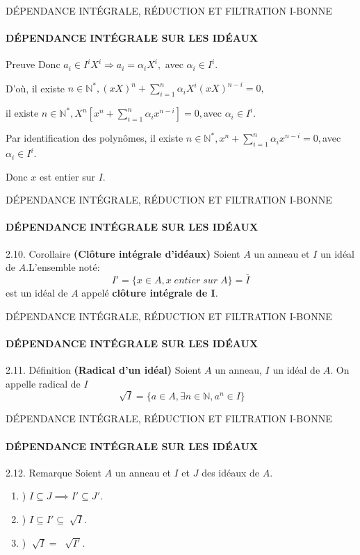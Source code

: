 \documentclass[11pt,a4paper]{beamer}
\begin{document}
\begin{frame}{DÉPENDANCE INTÉGRALE, RÉDUCTION ET FILTRATION I-BONNE}
	\framesubtitle{DÉPENDANCE INTÉGRALE SUR LES IDÉAUX}
	\begin{block}{Preuve}
			Donc $a_{i}\in I^{i}X^{i}\Rightarrow a_{i}=\alpha _{i}X^{i},$ avec $\alpha
		_{i}\in I^{i}.$
		
		D'où,  il existe $n\in \mathbb{N}^{\ast },(xX)^{n}+\sum\limits_{i=1}^{n}\alpha _{i}X^{i}(xX)^{n-i}=0,$
		
		il existe $n\in \mathbb{N}^{\ast },X^{n}[x^{n}+\sum\limits_{i=1}^{n}\alpha _{i}x^{n-i}]=0,$avec $\alpha _{i}\in I^{i}.$
		
		Par identification des polynômes, il existe $n\in \mathbb{N}^{\ast },x^{n}+\sum\limits_{i=1}^{n}\alpha _{i}x^{n-i}=0,$avec $\alpha_{i}\in I^{i}.$
		
		Donc $x$ est entier sur $I.$

	\end{block}
\end{frame}

\begin{frame}{DÉPENDANCE INTÉGRALE, RÉDUCTION ET FILTRATION I-BONNE}
	\framesubtitle{DÉPENDANCE INTÉGRALE SUR LES IDÉAUX}
	\begin{block}{2.10. Corollaire  \textbf{(Clôture intégrale d'idéaux)}}
		Soient $A$ un anneau et $I$ un idéal de $A$.L'ensemble noté: 
		\[ I'=\{x \in A, x \; entier \; sur \; A \} = \bar{I} \]
		est un idéal de $A$ appelé \textbf{clôture intégrale de I}.
		\end{block}
	\end{frame}

\begin{frame}{DÉPENDANCE INTÉGRALE, RÉDUCTION ET FILTRATION I-BONNE}
	\framesubtitle{DÉPENDANCE INTÉGRALE SUR LES IDÉAUX}
	\begin{block}{2.11. Définition  \textbf{(Radical d'un idéal)}}
	Soient $A$ un anneau, $I$ un idéal de $A$. On appelle radical de $I$
	\[\sqrt[]{I} = \{ a \in A, \exists n \in \mathbb{N}, a^n \in I \} \]
	\end{block}
\end{frame}

\begin{frame}{DÉPENDANCE INTÉGRALE, RÉDUCTION ET FILTRATION I-BONNE}
	\framesubtitle{DÉPENDANCE INTÉGRALE SUR LES IDÉAUX}
	\begin{alertblock}{2.12. Remarque }
		Soient $A$ un anneau et $I$ et $J$ des idéaux de $A$.
	\begin{enumerate}
	\item[1] ) $I \subseteq J \implies I' \subseteq J' $.
	\item[2] ) $I \subseteq I' \subseteq \sqrt[]{I} $.
	\item[3] ) $\sqrt[]{I} = \; \sqrt[]{I'} $.
	\end{enumerate}
	\end{alertblock}
\end{frame}
\end{document}
